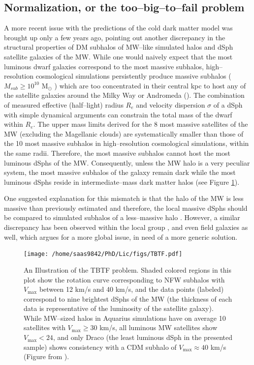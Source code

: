 \documentclass[a4wide,12pt]{book}
\begin{document}
\subsection{Normalization, or the too--big--to--fail problem}
\label{subsec:too-big-to-fail}
A more recent issue with the predictions of the cold dark matter model was brought up only a few years ago, pointing out another discrepancy in the structural properties of DM subhalos of MW--like simulated halos and dSph satellite galaxies of the MW. While one would naively expect that the most luminous dwarf galaxies correspond to the most massive subhalos, high--resolution cosmological simulations persistently produce massive subhalos ($M_{sub} \geq 10^{10} $ $\mathrm{M}_{\odot} $ ) which are too concentrated in their central kpc to host any of the satellite galaxies around the Milky Way or Andromeda (\cite{Boylan-Kolchin+2011, Boylan-Kolchin+2012}). The combination of measured effective (half--light) radius $R_e$ and velocity dispersion $\sigma$ of a dSph with simple dynamical arguments can constrain the total mass of the dwarf within $R_e$. The upper mass limits derived for the 8 most massive satellites of the MW (excluding the Magellanic clouds) are systematically smaller than those of the 10 most massive subhalos in high--resolution cosmological simulations, within the same radii. Therefore, the most massive subhalos cannot host the most luminous dSphs of the MW. Consequently, unless the MW halo is a very peculiar system, the most massive subhalos of the galaxy remain dark while the most luminous dSphs reside in intermediate--mass dark matter halos (see Figure \ref{fig:TBTF}). 

One suggested explanation for this mismatch is that the halo of the MW is less massive than previously estimated and therefore, the local massive dSphs should be compared to simulated subhalos of a less--massive halo \citep[][]{Boylan-Kolchin+2012, Vera-Ciro+2013}. However, a similar discrepancy has been observed within the local group \citep[][]{Kirby+2014, Garrison-Kimmel+2014, Tollerud+2014}, and even field galaxies \citep[][]{Papastergis+2015} as well, which argues for a more global issue, in need of a more generic solution. 

\begin{figure}
\centering
\texttt{[image: /home/saas9842/PhD/Lic/figs/TBTF.pdf]}
\caption{An Illustration of the TBTF problem. Shaded colored regions in this plot show the rotation curve corresponding to NFW subhalos with $V_\mathrm{max}$ between 12 km/s and 40 km/s, and the data points (labeled) correspond to nine brightest dSphs of the MW (the thickness of each data is representative of the luminosity of the satellite galaxy). While MW--sized halos in Aquarius simulations have on average 10 satellites with $V_\mathrm{max} \geq 30$ km/s, all luminous MW satellites show $V_\mathrm{max} < 24$, and only Draco (the least luminous dSph in the presented sample) shows consistency with a CDM subhalo of $V_\mathrm{max} \approx 40$ km/s (Figure from \citealt[][]{Boylan-Kolchin+2012}).}
\label{fig:TBTF}
\end{figure}
\end{document}
